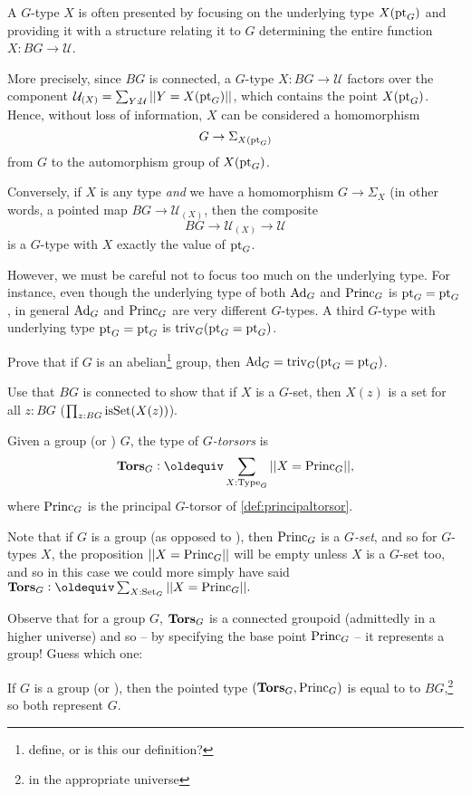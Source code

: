 \begin{remark}
  A $G$-type $X$ is often presented by focusing on the underlying type $X({\mathord{\mathrm{pt}}}_G)$  and providing it with a structure relating it to $G$ determining the entire function $X\colon BG\to\mathcal U$.

More precisely, since $BG$ is connected, a $G$-type $X\colon BG\to\mathcal U$ factors over the component $\mathcal U_{(X)}=\sum_{Y:\mathcal U}||Y=X({\mathord{\mathrm{pt}}}_G)||$, which contains the point $X({\mathord{\mathrm{pt}}}_G)$.  Hence, without loss of information, $X$ can be considered a homomorphism 
$$G\to\Sigma_{X({\mathord{\mathrm{pt}}}_G)}$$ from $G$ to the automorphism group of $X({\mathord{\mathrm{pt}}}_G)$.

Conversely, if $X$ is any type \emph{and} we have a homomorphism $G\to\Sigma_X$ (in other words, a pointed map $BG\to\mathcal U_{(X)}$, then the composite
$$BG\to \mathcal U_{(X)}\to \mathcal U$$
is a $G$-type with $X$ exactly the value of ${\mathord{\mathrm{pt}}}_G$.

However, we must be careful not to focus too much on the underlying type.  For instance, even though the underlying type of both $\mathrm{Ad}_G$ and $\mathrm{Princ}_G$ is ${\mathord{\mathrm{pt}}}_G={\mathord{\mathrm{pt}}}_G$, in general  $\mathrm{Ad}_G$ and $\mathrm{Princ}_G$  are very different $G$-types.  A third $G$-type with underlying type ${\mathord{\mathrm{pt}}}_G={\mathord{\mathrm{pt}}}_G$ is $\mathrm{triv}_G({\mathord{\mathrm{pt}}}_G={\mathord{\mathrm{pt}}}_G)$.
\end{remark}

\begin{xca}
  Prove that if $G$ is an abelian\footnote{define, or is this our definition?} group, then $\mathrm{Ad}_G=\mathrm{triv}_G({\mathord{\mathrm{pt}}}_G={\mathord{\mathrm{pt}}}_G)$.
\end{xca}
\begin{xca}
  Use that $BG$ is connected to show that if $X$ is a $G$-set, then $X(z)$ is a set for all $z:BG$ (\ie $\prod_{z:BG}\mathrm{isSet}(X(z))$).
\end{xca}
\begin{definition}
  Given a group (or \inftygp) $G$, the type of {\em$G$-torsors} is
$$\typetorsor_G\defequi\sum_{X:\Type_G}||X=\princ_G||,$$
where $\mathrm{Princ}_G$ is the principal $G$-torsor of \cref{def:principaltorsor}.
\end{definition}
\begin{remark}
  Note that if $G$ is a group (as opposed to \aninftygp), then $\mathrm{Princ}_G$ is a $G${\em-set}, and so for $G$-types $X$, the proposition $||X=\mathrm{Princ}_G||$ will be empty unless $X$ is a $G$-set too, and so in this case we could more simply have said $\typetorsor_G\defequi\sum_{X:\Set_G}||X=\princ_G||.$  

Observe that for a group $G$, $\mathbf{Tors}_G$ is a connected groupoid (admittedly in a higher universe) and so -- by specifying the base point $\mathrm{Princ}_G$ -- it represents a group!  Guess which one:
\end{remark}
\begin{lemma}\label{lem:BGbytorsor}
  If $G$ is a group (or \inftygp), then the pointed type $(\mathbf{Tors}_G,\mathrm{Princ}_G)$ is equal to to $BG$,\footnote{in the appropriate universe} so both represent $G$.
\end{lemma}

